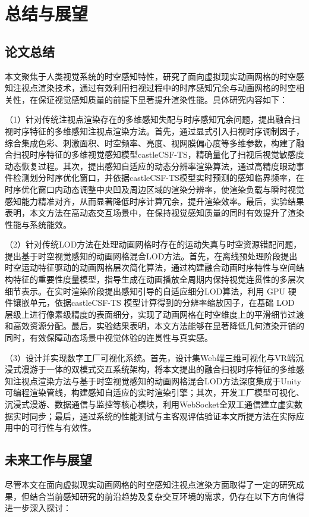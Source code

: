 \chapter{总结与展望}

\section{论文总结}

本文聚焦于人类视觉系统的时空感知特性，研究了面向虚拟现实动画网格的时空感知注视点渲染技术，通过有效利用扫视过程中的时序感知冗余与动画网格的时空相关性，在保证视觉感知质量的前提下显著提升渲染性能。具体研究内容如下：

（1）针对传统注视点渲染存在的多维感知失配与时序感知冗余问题，提出融合扫视时序特征的多维感知注视点渲染方法。首先，通过显式引入扫视时序调制因子，综合集成色彩、刺激面积、时空频率、亮度、视网膜偏心度等多维参数，构建了融合扫视时序特征的多维视觉感知模型castleCSF-TS，精确量化了扫视后视觉敏感度动态恢复过程。其次，提出感知自适应的动态分辨率渲染算法，通过高精度眼动事件检测划分时序优化窗口，并依据castleCSF-TS模型实时预测的感知临界频率，在时序优化窗口内动态调整中央凹及周边区域的渲染分辨率，使渲染负载与瞬时视觉感知能力精准对齐，从而显著降低时序计算冗余，提升渲染效率。最后，实验结果表明，本文方法在高动态交互场景中，在保持视觉感知质量的同时有效提升了渲染性能与系统能效。

（2）针对传统LOD方法在处理动画网格时存在的运动失真与时空资源错配问题，提出基于时空视觉感知的动画网格混合LOD方法。首先，在离线预处理阶段提出时空运动特征驱动的动画网格层次简化算法，通过构建融合动画时序特性与空间结构特征的重要性度量模型，指导生成在动画播放全周期内保持视觉连贯性的多层次细节表示。在实时渲染阶段提出感知引导的自适应细分LOD算法，利用 GPU 硬件镶嵌单元，依据castleCSF-TS 模型计算得到的分辨率缩放因子，在基础 LOD 层级上进行像素级精度的表面细分，实现了动画网格在时空维度上的平滑细节过渡和高效资源分配。最后，实验结果表明，本文方法能够在显著降低几何渲染开销的同时，有效保障动态场景中视觉体验的连贯性与真实感。

（3）设计并实现数字工厂可视化系统。首先，设计集Web端三维可视化与VR端沉浸式漫游于一体的双模式交互系统架构，将本文提出的融合扫视时序特征的多维感知注视点渲染方法与基于时空视觉感知的动画网格混合LOD方法深度集成于Unity可编程渲染管线，构建感知自适应的实时渲染引擎；其次，开发工厂模型可视化、沉浸式漫游、数据通信与监控等核心模块，利用WebSocket全双工通信建立虚实数据实时同步；最后，通过系统的性能测试与主客观评估验证本文所提方法在实际应用中的可行性与有效性。

\section{未来工作与展望}
尽管本文在面向虚拟现实动画网格的时空感知注视点渲染方面取得了一定的研究成果，但结合当前感知研究的前沿趋势及复杂交互环境的需求，仍存在以下方向值得进一步深入探讨：

